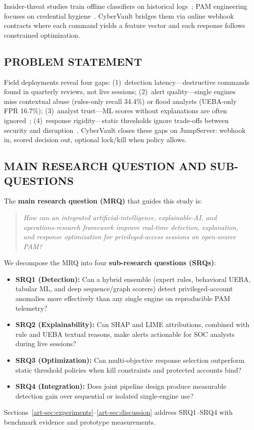 Insider-threat studies train offline classifiers on historical logs~\cite{ref10,ref24}; PAM engineering focuses on credential hygiene~\cite{ref1,ref26}. CyberVault bridges them via online webhook contracts where each command yields a feature vector and each response follows constrained optimization.

\subsection{PROBLEM STATEMENT}
Field deployments reveal four gaps: (1)~detection latency---destructive commands found in quarterly reviews, not live sessions; (2)~alert quality---single engines miss contextual abuse (rules-only recall 34.4\%) or flood analysts (UEBA-only FPR 16.7\%); (3)~analyst trust---ML scores without explanations are often ignored~\cite{ref12,ref13}; (4)~response rigidity---static thresholds ignore trade-offs between security and disruption~\cite{ref14,ref15}. CyberVault closes these gaps on JumpServer: webhook in, scored decision out, optional lock/kill when policy allows.

\subsection{MAIN RESEARCH QUESTION AND SUB-QUESTIONS}
The \textbf{main research question (MRQ)} that guides this study is:
\begin{quote}
\textit{How can an integrated artificial-intelligence, explainable-AI, and operations-research framework improve real-time detection, explanation, and response optimization for privileged-access sessions on open-source PAM?}
\end{quote}
We decompose the MRQ into four \textbf{sub-research questions (SRQs)}:
\begin{itemize}
\item \textbf{SRQ1 (Detection):} Can a hybrid ensemble (expert rules, behavioral UEBA, tabular ML, and deep sequence/graph scorers) detect privileged-account anomalies more effectively than any single engine on reproducible PAM telemetry?
\item \textbf{SRQ2 (Explainability):} Can SHAP and LIME attributions, combined with rule and UEBA textual reasons, make alerts actionable for SOC analysts during live sessions?
\item \textbf{SRQ3 (Optimization):} Can multi-objective response selection outperform static threshold policies when kill constraints and protected accounts bind?
\item \textbf{SRQ4 (Integration):} Does joint pipeline design produce measurable detection gain over sequential or isolated single-engine use?
\end{itemize}
Sections~\ref{art-sec:experiments}--\ref{art-sec:discussion} address SRQ1--SRQ4 with benchmark evidence and prototype measurements.

